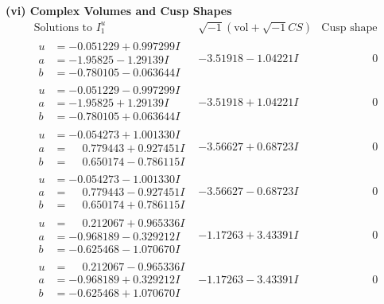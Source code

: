 \documentclass[1p]{elsarticle_modified}
\theoremstyle{definition}
\newcommand{\I}{\sqrt{-1}}
\begin{document}
\newpage\flushleft \textbf{(vi) Complex Volumes and Cusp Shapes}
$$\begin{array}{c|c|c}  
\text{Solutions to }I^u_{1}& \I (\text{vol} + \sqrt{-1}CS) & \text{Cusp shape}\\
 \hline 
\begin{aligned}
u &= -0.051229 + 0.997299 I \\
a &= -1.95825 - 1.29139 I \\
b &= -0.780105 - 0.063644 I\end{aligned}
 & -3.51918 - 1.04221 I & \phantom{-0.000000 } 0 \\ \hline\begin{aligned}
u &= -0.051229 - 0.997299 I \\
a &= -1.95825 + 1.29139 I \\
b &= -0.780105 + 0.063644 I\end{aligned}
 & -3.51918 + 1.04221 I & \phantom{-0.000000 } 0 \\ \hline\begin{aligned}
u &= -0.054273 + 1.001330 I \\
a &= \phantom{-}0.779443 + 0.927451 I \\
b &= \phantom{-}0.650174 - 0.786115 I\end{aligned}
 & -3.56627 + 0.68723 I & \phantom{-0.000000 } 0 \\ \hline\begin{aligned}
u &= -0.054273 - 1.001330 I \\
a &= \phantom{-}0.779443 - 0.927451 I \\
b &= \phantom{-}0.650174 + 0.786115 I\end{aligned}
 & -3.56627 - 0.68723 I & \phantom{-0.000000 } 0 \\ \hline\begin{aligned}
u &= \phantom{-}0.212067 + 0.965336 I \\
a &= -0.968189 - 0.329212 I \\
b &= -0.625468 - 1.070670 I\end{aligned}
 & -1.17263 + 3.43391 I & \phantom{-0.000000 } 0 \\ \hline\begin{aligned}
u &= \phantom{-}0.212067 - 0.965336 I \\
a &= -0.968189 + 0.329212 I \\
b &= -0.625468 + 1.070670 I\end{aligned}
 & -1.17263 - 3.43391 I & \phantom{-0.000000 } 0 \\ \hline\begin{aligned}

\end{aligned}
\end{array}$$
\end{document}
